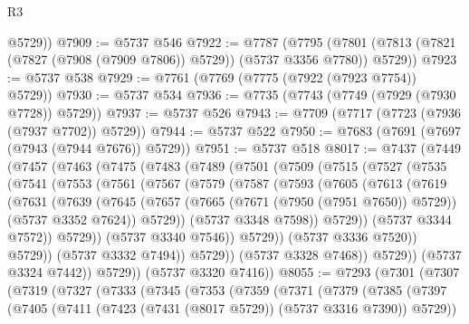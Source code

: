 \begin{lexlean}{R3}
\begin{coremodule}
        @5729))
@7909 := @5737 @546
@7922 := @7787
    (@7795 (@7801 (@7813 (@7821 (@7827 (@7908 (@7909 @7806)) @5729)) (@5737 @3356 @7780)) @5729))
@7923 := @5737 @538
@7929 := @7761 (@7769 (@7775 (@7922 (@7923 @7754)) @5729))
@7930 := @5737 @534
@7936 := @7735 (@7743 (@7749 (@7929 (@7930 @7728)) @5729))
@7937 := @5737 @526
@7943 := @7709 (@7717 (@7723 (@7936 (@7937 @7702)) @5729))
@7944 := @5737 @522
@7950 := @7683 (@7691 (@7697 (@7943 (@7944 @7676)) @5729))
@7951 := @5737 @518
@8017 := @7437
    (@7449
      (@7457
        (@7463
          (@7475
            (@7483
              (@7489
                (@7501
                  (@7509
                    (@7515
                      (@7527
                        (@7535
                          (@7541
                            (@7553
                              (@7561
                                (@7567
                                  (@7579
                                    (@7587
                                      (@7593
                                        (@7605
                                          (@7613
                                            (@7619
                                              (@7631
                                                (@7639
                                                  (@7645
                                                    (@7657
                                                      (@7665 (@7671 (@7950 (@7951 @7650)) @5729))
                                                      (@5737 @3352 @7624))
                                                    @5729))
                                                (@5737 @3348 @7598))
                                              @5729))
                                          (@5737 @3344 @7572))
                                        @5729))
                                    (@5737 @3340 @7546))
                                  @5729))
                              (@5737 @3336 @7520))
                            @5729))
                        (@5737 @3332 @7494))
                      @5729))
                  (@5737 @3328 @7468))
                @5729))
            (@5737 @3324 @7442))
          @5729))
      (@5737 @3320 @7416))
@8055 := @7293
    (@7301
      (@7307
        (@7319
          (@7327
            (@7333
              (@7345
                (@7353
                  (@7359
                    (@7371
                      (@7379
                        (@7385
                          (@7397
                            (@7405 (@7411 (@7423 (@7431 (@8017 @5729)) (@5737 @3316 @7390)) @5729))

\end{coremodule}
\end{lexlean}

